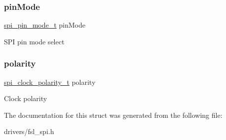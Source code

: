 \subsubsection{\texorpdfstring{pinMode}{pinMode}}
{\footnotesize\ttfamily \mbox{\hyperlink{group__spi__driver_ga4d2e20ceaf81868a429938113afe8726}{spi\+\_\+pin\+\_\+mode\+\_\+t}} pin\+Mode}

S\+PI pin mode select \mbox{\label{struct__spi__slave__config_ad5743b187f5dda0c1786a192ba11b043}} 
\subsubsection{\texorpdfstring{polarity}{polarity}}
{\footnotesize\ttfamily \mbox{\hyperlink{group__spi__driver_ga9de95ac02ae859ac26534c06eb47b5b8}{spi\+\_\+clock\+\_\+polarity\+\_\+t}} polarity}

Clock polarity 

The documentation for this struct was generated from the following file\+:\begin{DoxyCompactItemize}
\item 
drivers/fsl\+\_\+spi.\+h\end{DoxyCompactItemize}
